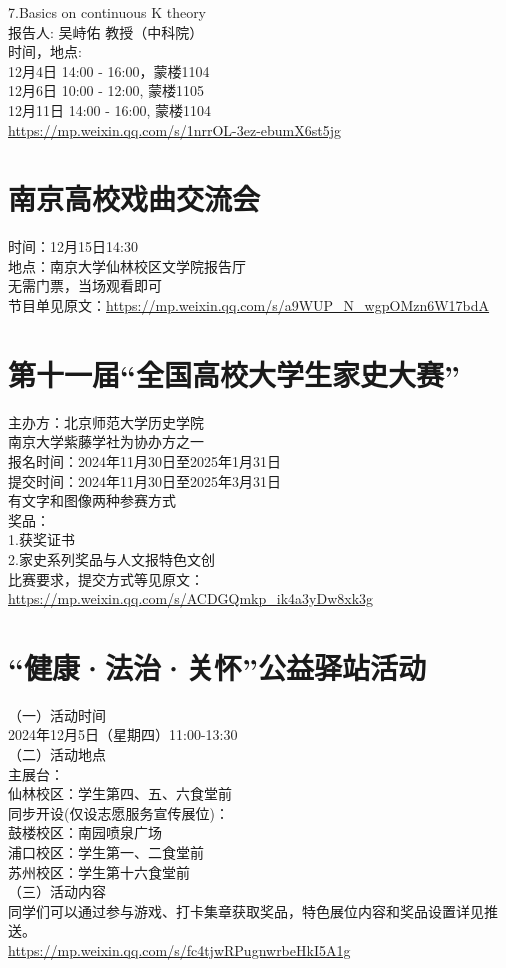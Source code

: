 \documentclass[letterpaper, 12pt]{article}
\begin{document}
\begin{multicols}{2}
7.Basics on continuous K theory\\
报告人: 吴峙佑 教授（中科院）\\
时间，地点:\\
12月4日 14:00 - 16:00，蒙楼1104\\
12月6日 10:00 - 12:00,  蒙楼1105\\
12月11日 14:00 - 16:00,  蒙楼1104\\
\url{https://mp.weixin.qq.com/s/1nrrOL-3ez-ebumX6st5jg}\\


\section{南京高校戏曲交流会}
时间：12月15日14:30\\
地点：南京大学仙林校区文学院报告厅\\
无需门票，当场观看即可\\
节目单见原文：\url{https://mp.weixin.qq.com/s/a9WUP_N_wgpOMzn6W17bdA}

\section{第十一届“全国高校大学生家史大赛”}
主办方：北京师范大学历史学院\\
南京大学紫藤学社为协办方之一\\
报名时间：2024年11月30日至2025年1月31日\\
提交时间：2024年11月30日至2025年3月31日\\
有文字和图像两种参赛方式\\
奖品：\\
1.获奖证书\\
2.家史系列奖品与人文报特色文创\\
比赛要求，提交方式等见原文：\url{https://mp.weixin.qq.com/s/ACDGQmkp_ik4a3yDw8xk3g}

\section{“健康·法治·关怀”公益驿站活动}
（一）活动时间\\
2024年12月5日（星期四）11:00-13:30\\
（二）活动地点\\
主展台：\\
仙林校区：学生第四、五、六食堂前\\
同步开设(仅设志愿服务宣传展位)：\\
鼓楼校区：南园喷泉广场\\
浦口校区：学生第一、二食堂前\\
苏州校区：学生第十六食堂前\\
（三）活动内容\\
同学们可以通过参与游戏、打卡集章获取奖品，特色展位内容和奖品设置详见推送。\\
\url{https://mp.weixin.qq.com/s/fc4tjwRPugnwrbeHkI5A1g}


\end{multicols}
\end{document}
